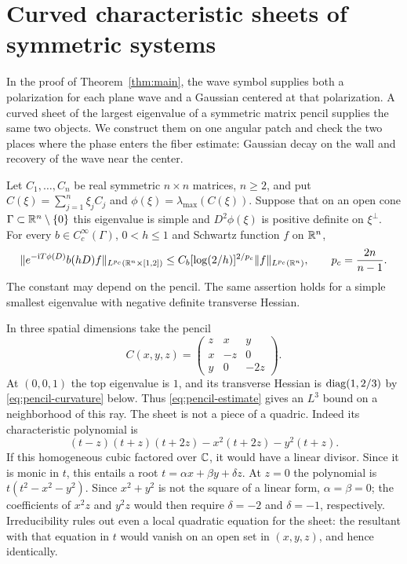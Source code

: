 \section{Curved characteristic sheets of symmetric systems}\label{sec:pencil}

In the proof of Theorem~\ref{thm:main}, the wave symbol supplies both a
polarization for each plane wave and a Gaussian centered at that
polarization. A curved sheet of the largest eigenvalue of a symmetric
matrix pencil supplies the same two objects. We construct them on one
angular patch and check the two places where the phase enters the
fiber estimate: Gaussian decay on the wall and recovery of the wave
near the center.

\begin{theorem}\label{thm:pencil}
Let $C_1,\ldots,C_n$ be real symmetric $n\times n$ matrices, $n\ge2$, and
put $C(\xi)=\sum_{j=1}^n\xi_jC_j$ and $\phi(\xi)=\lambda_{\max}(C(\xi))$.
Suppose that on an open cone $\Gamma\subset\mathbb R^n\setminus\{0\}$ this
eigenvalue is simple and $D^2\phi(\xi)$ is positive definite on $\xi^\perp$.
For every $b\in C_c^\infty(\Gamma)$, $0<h\le1$ and Schwartz function
$f$ on $\mathbb R^n$,
\begin{equation}\label{eq:pencil-estimate}
 \|e^{-\mathrm iT\phi(D)}b(hD)f\|_{L^{p_c}(\mathbb R^n\times[1,2])}
 \le C_b[\log(2/h)]^{2/p_c}\|f\|_{L^{p_c}(\mathbb R^n)},\qquad
 p_c=\frac{2n}{n-1}.
\end{equation}
The constant may depend on the pencil. The same assertion holds for a
simple smallest eigenvalue with negative definite transverse Hessian.
\end{theorem}

\begin{example}
In three spatial dimensions take the pencil
\[
 C(x,y,z)=\begin{pmatrix}z&x&y\\ x&-z&0\\ y&0&-2z\end{pmatrix}.
\]
At $(0,0,1)$ the top eigenvalue is $1$, and its transverse Hessian is
$\operatorname{diag}(1,2/3)$ by \eqref{eq:pencil-curvature} below. Thus
\eqref{eq:pencil-estimate} gives an $L^3$ bound on a neighborhood of this ray.
The sheet is not a piece of a quadric. Indeed its characteristic polynomial is
\[
 (t-z)(t+z)(t+2z)-x^2(t+2z)-y^2(t+z).
\]
If this homogeneous cubic factored over $\mathbb C$, it would have a linear
divisor. Since it is monic in $t$, this entails a root
$t=\alpha x+\beta y+\delta z$. At $z=0$ the polynomial is
$t(t^2-x^2-y^2)$. Since $x^2+y^2$ is not the square of a linear form,
$\alpha=\beta=0$; the coefficients of $x^2z$ and $y^2z$ would then
require $\delta=-2$ and $\delta=-1$, respectively.
Irreducibility rules out even a local quadratic equation for the sheet:
the resultant with that equation in $t$ would vanish on an open set in
$(x,y,z)$, and hence identically.
\end{example}

